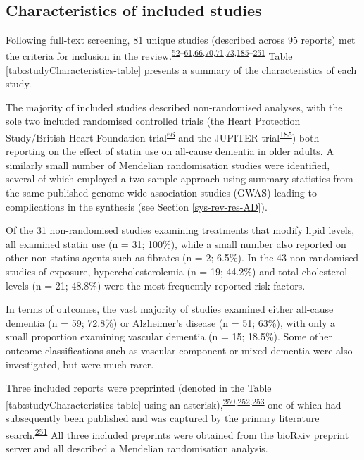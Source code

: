 \documentclass[a4paper, twoside]{templates/ociamthesis}
\begin{document}
~

\hypertarget{sys-rev-characteristics}{%
\subsection{Characteristics of included studies}\label{sys-rev-characteristics}}

Following full-text screening, 81 unique studies (described across 95 reports) met the criteria for inclusion in the review.\textsuperscript{\protect\hyperlink{ref-kivipelto2005}{52}--\protect\hyperlink{ref-reitz2004}{61},\protect\hyperlink{ref-heartprotectionstudycollaborativegroup2002}{66},\protect\hyperlink{ref-larsson2017}{70},\protect\hyperlink{ref-ostergaard2015}{71},\protect\hyperlink{ref-benn2017}{73},\protect\hyperlink{ref-ridker2008}{185}--\protect\hyperlink{ref-zhu2018}{251}} Table \ref{tab:studyCharacteristics-table} presents a summary of the characteristics of each study.

The majority of included studies described non-randomised analyses, with the sole two included randomised controlled trials (the Heart Protection Study/British Heart Foundation trial\textsuperscript{\protect\hyperlink{ref-heartprotectionstudycollaborativegroup2002}{66}} and the JUPITER trial\textsuperscript{\protect\hyperlink{ref-ridker2008}{185}}) both reporting on the effect of statin use on all-cause dementia in older adults. A similarly small number of Mendelian randomisation studies were identified, several of which employed a two-sample approach using summary statistics from the same published genome wide association studies (GWAS) leading to complications in the synthesis (see Section \ref{sys-rev-res-AD}).

Of the 31 non-randomised studies examining treatments that modify lipid levels, all examined statin use (n = 31; 100\%), while a small number also reported on other non-statins agents such as fibrates (n = 2; 6.5\%). In the 43 non-randomised studies of exposure, hypercholesterolemia (n = 19; 44.2\%) and total cholesterol levels (n = 21; 48.8\%) were the most frequently reported risk factors.

In terms of outcomes, the vast majority of studies examined either all-cause dementia (n = 59; 72.8\%) or Alzheimer's disease (n = 51; 63\%), with only a small proportion examining vascular dementia (n = 15; 18.5\%). Some other outcome classifications such as vascular-component or mixed dementia were also investigated, but were much rarer.

Three included reports were preprinted (denoted in the Table \ref{tab:studyCharacteristics-table} using an asterisk),\textsuperscript{\protect\hyperlink{ref-so2017}{250},\protect\hyperlink{ref-andrews2019}{252},\protect\hyperlink{ref-zhu2017}{253}} one of which had subsequently been published and was captured by the primary literature search.\textsuperscript{\protect\hyperlink{ref-zhu2018}{251}} All three included preprints were obtained from the bioRxiv preprint server and all described a Mendelian randomisation analysis.
\end{document}
